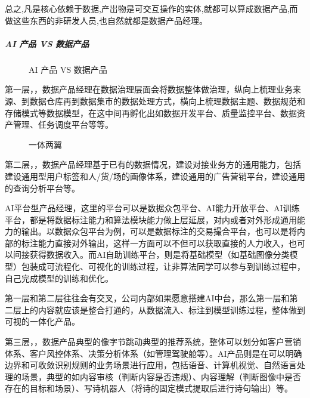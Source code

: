 \documentclass[letterpaper,11pt,english]{sphinxmanual}
\begin{document}
总之,凡是核心依赖于数据,产岀物是可交互操作的实体,就都可以算成数据产品,而做这些东西的非研发人员,也自然就都是数据产品经理。


\subparagraph{AI 产品 VS 数据产品}
\label{\detokenize{chapter_introduction/AI_PM:ai-vs}}
\begin{figure}[H]
\centering
\capstart

\noindent{}
\caption{AI 产品 VS
数据产品\sphinxfootnotemark[248]}\label{\detokenize{chapter_introduction/AI_PM:id59}}\end{figure}
%
\begin{footnotetext}[248]\sphinxAtStartFootnote
{}
%
\end{footnotetext}\ignorespaces 
第一层，，数据产品经理在数据治理层面会将数据整体做治理，纵向上梳理业务来源、到数据仓库再到数据集市的数据处理方式，横向上梳理数据主题、数据规范和存储模式等数据模型，在这中间再孵化出如数据开发平台、质量监控平台、数据资产管理、任务调度平台等等。

\begin{figure}[H]
\centering
\capstart

\noindent{}
\caption{一体两翼}\label{\detokenize{chapter_introduction/AI_PM:id60}}\end{figure}

第二层，，数据产品经理基于已有的数据情况，建设对接业务方的通用能力，包括建设通用型用户标签和人/货/场的画像体系，建设通用的广告营销平台，建设通用的查询分析平台等。

AI平台型产品经理，这里的平台可以是数据众包平台、AI能力开放平台、AI训练平台，都是将数据标注能力和算法模块能力做上层延展，对内或者对外形成通用能力的输出。以数据众包平台为例，可以是数据标注的交易撮合平台，也可以是将内部的标注能力直接对外输出，这样一方面可以不但可以获取直接的人力收入，也可以间接获得数据收入。而AI自助训练平台，则是将基础模型（如基础图像分类模型）包装成可流程化、可视化的训练过程，让非算法同学可以参与到训练过程中，自己完成模型的训练和优化。

第一层和第二层往往会有交叉，公司内部如果愿意搭建AI中台，那么第一层和第二层上的内容就应该是整合打通的，从数据流入、标注到模型训练过程，整体做到可视的一体化产品。

第三层，，数据产品典型的像字节跳动典型的推荐系统，整体可以划分如客户营销体系、客户风控体系、决策分析体系（如管理驾驶舱等）。AI产品则是在可以明确边界和可收敛识别规则的业务场景进行应用，包括语音、计算机视觉、自然语言处理的场景，典型的如内容审核（判断内容是否违规）、内容理解（判断图像中是否存在的目标和场景）、写诗机器人（将诗的固定模式提取后进行诗句输出）等。
\end{document}
